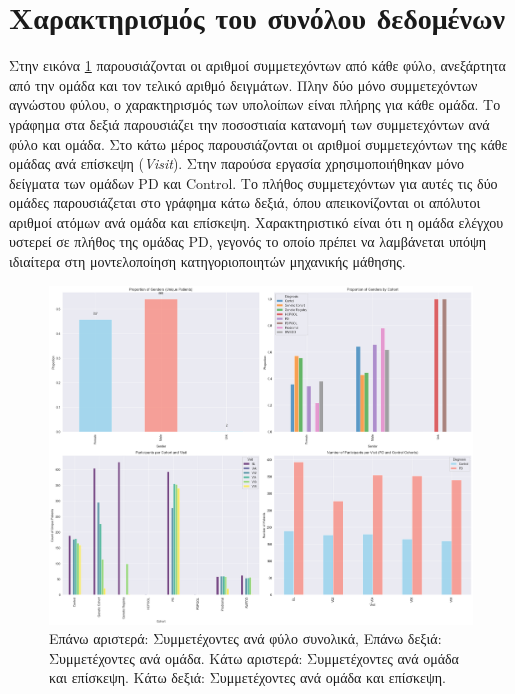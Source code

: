 \documentclass[12pt]{report}
\makeatletter
\let\oldchapter\chapter
\renewcommand{\chapter}{\@ifstar{\starchapter}{\nostarchapter}}
\newcommand{\starchapter}[1]{\oldchapter*{#1}\thispagestyle{mainstyle}}
\newcommand{\nostarchapter}[1]{\oldchapter{#1}\thispagestyle{mainstyle}}
\makeatother
\begin{document}
    \chapter{Αποτελέσματα}
        \section{Χαρακτηρισμός του συνόλου δεδομένων}
        \par
            Στην εικόνα \ref{fig:ppmi-proportion-of-genders-absolute-and-per-cohort} παρουσιάζονται οι αριθμοί συμμετεχόντων από κάθε φύλο, ανεξάρτητα από την ομάδα και τον τελικό αριθμό δειγμάτων. Πλην δύο μόνο συμμετεχόντων αγνώστου φύλου, ο χαρακτηρισμός των υπολοίπων είναι πλήρης για κάθε ομάδα. Το γράφημα στα δεξιά παρουσιάζει την ποσοστιαία κατανομή των συμμετεχόντων ανά φύλο και ομάδα. Στο κάτω μέρος παρουσιάζονται οι αριθμοί συμμετεχόντων της κάθε ομάδας ανά επίσκεψη (\emph{Visit}). Στην παρούσα εργασία χρησιμοποιήθηκαν μόνο δείγματα των ομάδων PD  και Control. Το πλήθος συμμετεχόντων για αυτές τις δύο ομάδες παρουσιάζεται στο γράφημα κάτω δεξιά, όπου απεικονίζονται οι απόλυτοι αριθμοί ατόμων ανά ομάδα και επίσκεψη. Χαρακτηριστικό είναι ότι η ομάδα ελέγχου υστερεί σε πλήθος της ομάδας PD, γεγονός το οποίο πρέπει να λαμβάνεται υπόψη ιδιαίτερα στη μοντελοποίηση κατηγοριοποιητών μηχανικής μάθησης.
            \begin{figure}[h]
                \centering
                \includegraphics[width=0.73\linewidth]{Chapter-2-Section-2.1/ppmi-prop-gender-abs-per-cohort_samples-per-coh-visit-all-coh_pd-vs-ctrl.png}
                \caption[Πλήθος συμμετεχόντων ανά φύλο]{Επάνω αριστερά: Συμμετέχοντες ανά φύλο συνολικά, Επάνω δεξιά: Συμμετέχοντες ανά ομάδα. Κάτω αριστερά: Συμμετέχοντες ανά ομάδα και επίσκεψη. Κάτω δεξιά: Συμμετέχοντες ανά ομάδα και επίσκεψη.}
                \label{fig:ppmi-proportion-of-genders-absolute-and-per-cohort}
            \end{figure}
\end{document}
